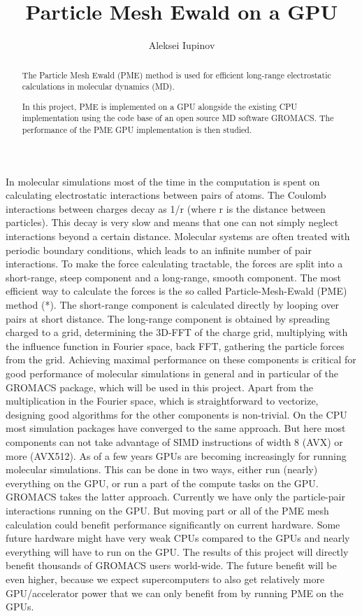 \documentclass[12pt,a4paper]{report}
\author{Aleksei Iupinov}
\title{Particle Mesh Ewald on a GPU}
\newcommand{\draft}[1]{#1}
\begin{document}


\begin{abstract}

The Particle Mesh Ewald (PME) method is used for efficient long-range electrostatic calculations in molecular dynamics (MD).
 
In this project, PME is implemented on a GPU alongside the existing CPU implementation using the code base of an open source MD software GROMACS. The performance of the PME GPU implementation is then studied. 


\end{abstract}
\newpage

\tableofcontents
\newpage


\iffalse
In molecular simulations most of the time in the computation is spent on calculating electrostatic interactions between pairs of atoms. The Coulomb interactions between charges decay as 1/r (where r is the distance between particles). This decay is very slow and means that one can not simply neglect interactions beyond a certain distance. Molecular systems are often treated with periodic boundary conditions, which leads to an infinite number of pair interactions. To make the force calculating tractable, the forces are split into a short-range, steep component and a long-range, smooth component. The most efficient way to calculate the forces is the so called Particle-Mesh-Ewald (PME) method (*). The short-range component is calculated directly by looping over pairs at short distance. The long-range component is obtained by spreading charged to a grid, determining the 3D-FFT of the charge grid, multiplying with the influence function in Fourier space, back FFT, gathering the particle forces from the grid. Achieving maximal performance on these components is critical for good performance of molecular simulations in general and in particular of the GROMACS package, which will be used in this project. Apart from the multiplication in the Fourier space, which is straightforward to vectorize, designing good algorithms for the other components is non-trivial. On the CPU most simulation packages have converged to the same approach. But here most components can not take advantage of SIMD instructions of width 8 (AVX) or more (AVX512). As of a few years GPUs are becoming increasingly for running molecular simulations. This can be done in two ways, either run (nearly) everything on the GPU, or run a part of the compute tasks on the GPU. GROMACS takes the latter approach. Currently we have only the particle-pair interactions running on the GPU. But moving part or all of the PME mesh calculation could benefit performance significantly on current hardware. Some future hardware might have very weak CPUs compared to the GPUs and nearly everything will have to run on the GPU. The results of this project will directly benefit thousands of GROMACS users world-wide. The future benefit will be even higher, because we expect supercomputers to also get relatively more GPU/accelerator power that we can only benefit from by running PME on the GPUs.
\end{document}
